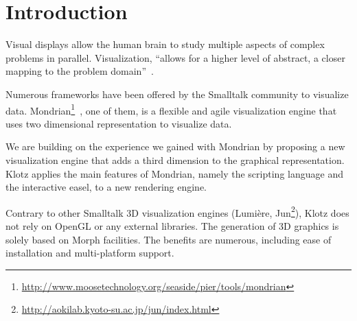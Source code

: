 \documentclass{sig-alternate}
\newcommand{\seclabel}[1]{\label{sec:#1}}
\newcommand{\figlabel}[1]{\label{fig:#1}}
\begin{document}




\section{Introduction} \seclabel{introduction}

Visual displays allow the human brain to study multiple aspects of complex problems in parallel. Visualization, ``allows for a higher level of abstract, a closer mapping to the problem domain''~\cite{Petr95a}. 

Numerous frameworks have been offered by the Smalltalk community to visualize data. Mondrian\footnote{\url{http://www.moosetechnology.org/seaside/pier/tools/mondrian}}~\cite{Meye06a}, one of them, is a flexible and agile visualization engine that uses two dimensional representation to visualize data.  

We are building on the experience we gained with Mondrian by proposing a new visualization engine that adds a third dimension to the graphical representation. Klotz applies the main features of Mondrian, namely the scripting language and the interactive easel, to a new rendering engine.

Contrary to other Smalltalk 3D visualization engines (Lumi\`ere\cite{Oliv09a}, Jun\footnote{\url{http://aokilab.kyoto-su.ac.jp/jun/index.html}}), Klotz does not rely on OpenGL or any external libraries. The generation of 3D graphics is solely based on Morph facilities. The benefits are numerous, including ease of installation and multi-platform support.
\end{document}
